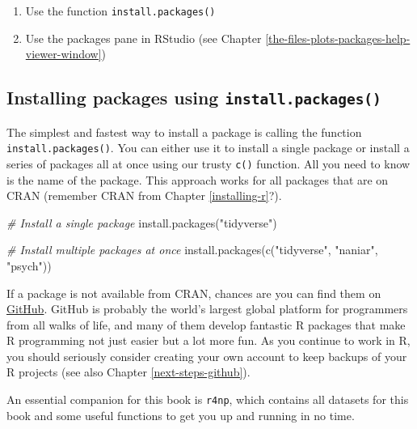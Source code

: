 \documentclass[
]{book}
\newenvironment{Shaded}{\begin{snugshade}}{\end{snugshade}}
\newcommand{\CommentTok}[1]{\textcolor[rgb]{0.56,0.35,0.01}{\textit{#1}}}
\newcommand{\FunctionTok}[1]{\textcolor[rgb]{0.00,0.00,0.00}{#1}}
\newcommand{\NormalTok}[1]{#1}
\newcommand{\StringTok}[1]{\textcolor[rgb]{0.31,0.60,0.02}{#1}}
\begin{document}
\begin{enumerate}
\def\labelenumi{\arabic{enumi}.}
\item
  Use the function \texttt{install.packages()}
\item
  Use the packages pane in RStudio (see Chapter \ref{the-files-plots-packages-help-viewer-window})
\end{enumerate}

\hypertarget{installing-packages-using-a-function}{%
\subsection{\texorpdfstring{Installing packages using \texttt{install.packages()}}{Installing packages using install.packages()}}\label{installing-packages-using-a-function}}

The simplest and fastest way to install a package is calling the function \texttt{install.packages()}. You can either use it to install a single package or install a series of packages all at once using our trusty \texttt{c()} function. All you need to know is the name of the package. This approach works for all packages that are on CRAN (remember CRAN from Chapter \ref{installing-r}?).

\begin{Shaded}
\begin{Highlighting}[]
\CommentTok{\# Install a single package}
\FunctionTok{install.packages}\NormalTok{(}\StringTok{"tidyverse"}\NormalTok{)}

\CommentTok{\# Install multiple packages at once}
\FunctionTok{install.packages}\NormalTok{(}\FunctionTok{c}\NormalTok{(}\StringTok{"tidyverse"}\NormalTok{, }\StringTok{"naniar"}\NormalTok{, }\StringTok{"psych"}\NormalTok{))}
\end{Highlighting}
\end{Shaded}

If a package is not available from CRAN, chances are you can find them on \href{https://github.com}{GitHub}. GitHub is probably the world's largest global platform for programmers from all walks of life, and many of them develop fantastic R packages that make R programming not just easier but a lot more fun. As you continue to work in R, you should seriously consider creating your own account to keep backups of your R projects (see also Chapter \ref{next-steps-github}).

An essential companion for this book is \texttt{r4np}, which contains all datasets for this book and some useful functions to get you up and running in no time.
\end{document}
